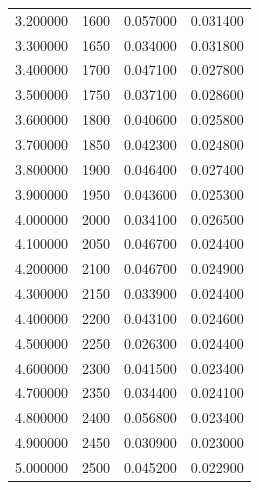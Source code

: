 \begin{tabular}{rrrr}
3.200000 & 1600 & 0.057000 & 0.031400 \\
3.300000 & 1650 & 0.034000 & 0.031800 \\
3.400000 & 1700 & 0.047100 & 0.027800 \\
3.500000 & 1750 & 0.037100 & 0.028600 \\
3.600000 & 1800 & 0.040600 & 0.025800 \\
3.700000 & 1850 & 0.042300 & 0.024800 \\
3.800000 & 1900 & 0.046400 & 0.027400 \\
3.900000 & 1950 & 0.043600 & 0.025300 \\
4.000000 & 2000 & 0.034100 & 0.026500 \\
4.100000 & 2050 & 0.046700 & 0.024400 \\
4.200000 & 2100 & 0.046700 & 0.024900 \\
4.300000 & 2150 & 0.033900 & 0.024400 \\
4.400000 & 2200 & 0.043100 & 0.024600 \\
4.500000 & 2250 & 0.026300 & 0.024400 \\
4.600000 & 2300 & 0.041500 & 0.023400 \\
4.700000 & 2350 & 0.034400 & 0.024100 \\
4.800000 & 2400 & 0.056800 & 0.023400 \\
4.900000 & 2450 & 0.030900 & 0.023000 \\
5.000000 & 2500 & 0.045200 & 0.022900 \\
\bottomrule
\end{tabular}
